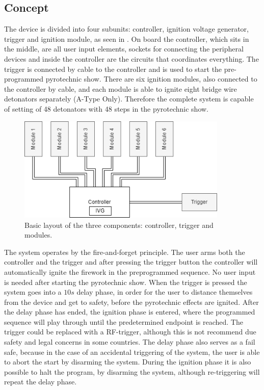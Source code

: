 \pagebreak
\subsection{Concept}
\label{Concept}
The device is divided into four subunits: controller, ignition voltage generator, trigger and ignition module, as seen in . On board the controller, which sits in the middle, are all user input elements, sockets for connecting the peripheral devices and inside the controller are the circuits that coordinates everything. The trigger is connected by cable to the controller and is used to start the pre-programmed pyrotechnic show. There are six ignition modules, also connected to the controller by cable, and each module is able to ignite eight bridge wire detonators separately (A-Type Only).  Therefore the complete system is capable of setting of 48 detonators with 48 steps in the pyrotechnic show. 


\begin{figure}[!ht]
    \centering
    \includegraphics[width=10cm]{./Figures/concept_all.png}
    \caption{Basic layout of the three components: controller, trigger and modules.}
    \label{fig:concept}     
\end{figure}

\noindent The system operates by the fire-and-forget principle. The user arms both the controller and the trigger and after pressing the trigger button the controller will automatically ignite the firework in the preprogrammed sequence. No user input is needed after starting the pyrotechnic show. When the trigger is pressed the system goes into a $10s$ delay phase, in order for the user to distance themselves from the device and get to safety, before the pyrotechnic effects are ignited. After the delay phase has ended, the ignition phase is entered, where the programmed sequence will play through until the predetermined endpoint is reached. The trigger could be replaced with a RF-trigger, although this is not recommend due safety and legal concerns in some countries. The delay phase also serves as a fail safe, because in the case of an accidental triggering of the system, the user is able to abort the start by disarming the system. During the ignition phase it is also possible to halt the program, by disarming the system, although re-triggering will repeat the delay phase.\\


